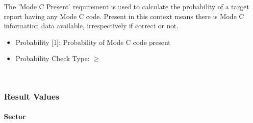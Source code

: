 The 'Mode C Present' requirement is used to calculate the probability of a target report having any Mode C code. Present in this context means there is Mode C information data available, irrespectively if correct or not. \\

\begin{itemize}  
\item Probability [1]: Probability of Mode C code present
\item Probability Check Type: $\geq$
\end{itemize}
\ \\

\subsubsection{Result Values}

\paragraph{Sector}

